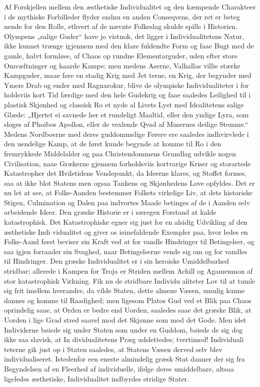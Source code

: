 \documentclass[12pt]{book}
\newcommand{\opage}[1]{\marginnote{\footnotesize\textit{[#1]}}}
\begin{document}
Af Forskjellen mellem den æsthetiske Individualitet
og den kæmpende Charakteer i de mythiske Forbilleder
flyder endnu en anden Conseqvens, der ret er beteg\-%
nende for den Rolle, ethvert af de nævnte Folkeslag
skulde spille i Historien. Olympens „salige Guder“ have
jo vistnok, det ligger i Individualitetens Natur, ikke kunnet
trænge igjennem med den klare fuldendte Form og
faae Bugt med de gamle, halvt formløse, af Chaos op\-%
rundne Elementarguder, uden efter store Omvæltninger
og haarde Kampe; men medens Aserne, Valhallas villie\-%
stærke Kampguder, maae føre en stadig Krig med Jet\-%
terne, en Krig, der begynder med Ymers Drab og ender
med Ragnarokur, blive de olympiske Individualiteter i for\-%
holdsviis kort Tid færdige med den hele Gudekrig og faae
saaledes Leilighed til i plastisk Skjønhed og classisk Ro et
nyde al Livets Lyst med Idealitetens salige Glæde: „Hjertet
ei savnede her et rundeligt Maaltid, eller den yndige Lyra,
som sloges af Phoibos Apollon, eller de vexlende Qvad
\opage{24}\setcounter{footnote}{0}%
af Musernes deilige Stemme.“ Medens Nordboerne med
deres guddommelige Førere ere saaledes indhvirvlede i
den uendelige Kamp, at de først kunde begynde at
komme til Ro i den fremrykkede Middelalder og paa
Christendommens Grundlag udvikle nogen Civilisation,
naae Grækerne gjennem forholdsviis kortvarige Kriser og
storartede Katastropher det Hviletidens Vendepunkt, da
Ideerne klares, og Stoffet formes, saa at ikke blot Statens
men ogsaa Tankens og Skjønhedens Love opfyldes. Det
er nu let at see, at Folke-Aanden bestemmer Folkets
virkelige Liv, at dets historiske Stigen, Culmination og
Dalen paa indvortes Maade betinges af de i Aanden selv
arbeidende Ideer. Den græske Historie er i særegen
Forstand at kalde katastrophisk. Det Katastrophiske egner
sig just for en alsidig Udvikling af den æsthetiske Indi\-%
vidualitet og giver os iøinefaldende Exempler paa, hvor\-%
ledes en Folke-Aand først beviser sin Kraft ved at for\-%
vandle Hindringer til Betingelser, og saa igjen forraader
sin Svaghed, naar Betingelserne vende sig om og for\-%
vandles til Hindringer. Den græske Individualitet er i sin
heroiske Umiddelbarhed stridbar; allerede i Kampen for
Troja er Striden mellem Achill og Agamemnon af stor
katastrophisk Virkning. Fik nu de stridbare Individu\-%
aliteter Lov til at tumle sig frit imellem hverandre, da
vilde Staten, dette almene Væsen, umulig kunne dannes
og komme til Raadighed; men ligesom Platos Gud ved
et Blik paa Chaos oprindelig saae, at Orden er bedre end
Uorden, saaledes saae det græske Blik, at Uorden i lige
Grad stred saavel mod det Skjønne som mod det Gode.
Men idet Individerne bøiede sig under Staten som under
en Guddom, bøiede de sig dog ikke saa slavisk, at In\-%
dividualitetens Præg udslettedes; tvertimod! Individuali\-%
teterne gik just op i Staten saaledes, at Statens Væsen
derved selv blev individualiseret. Istedenfor een eneste
\opage{25}\setcounter{footnote}{0}%
almindelig græsk Stat danner der sig fra Begyndelsen
af en Fleerhed af individuelle, ifølge deres umiddelbare,
altsaa ligeledes æsthetiske, Individualitet indbyrdes stridige
Stater.
\end{document}
